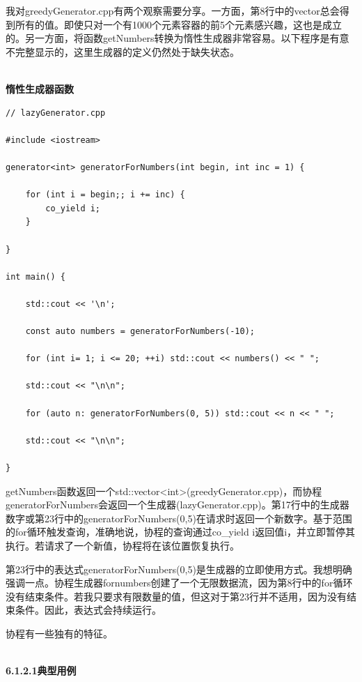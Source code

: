 我对greedyGenerator.cpp有两个观察需要分享。一方面，第8行中的vector总会得到所有的值。即使只对一个有1000个元素容器的前5个元素感兴趣，这也是成立的。另一方面，将函数getNumbers转换为惰性生成器非常容易。以下程序是有意不完整显示的，这里生成器的定义仍然处于缺失状态。

\hspace*{\fill} \\ %
\noindent
\textbf{惰性生成器函数}
\begin{lstlisting}[style=styleCXX]
// lazyGenerator.cpp

#include <iostream>

generator<int> generatorForNumbers(int begin, int inc = 1) {

	for (int i = begin;; i += inc) {
		co_yield i;
	}

}

int main() {

	std::cout << '\n';
	
	const auto numbers = generatorForNumbers(-10);
	
	for (int i= 1; i <= 20; ++i) std::cout << numbers() << " ";
	
	std::cout << "\n\n";
	
	for (auto n: generatorForNumbers(0, 5)) std::cout << n << " ";
	
	std::cout << "\n\n";

}
\end{lstlisting}

getNumbers函数返回一个std::vector<int>(greedyGenerator.cpp)，而协程generatorForNumbers会返回一个生成器(lazyGenerator.cpp)。第17行中的生成器数字或第23行中的generatorForNumbers(0,5)在请求时返回一个新数字。基于范围的for循环触发查询，准确地说，协程的查询通过co\_yield i返回值i，并立即暂停其执行。若请求了一个新值，协程将在该位置恢复执行。

第23行中的表达式generatorForNumbers(0,5)是生成器的立即使用方式。我想明确强调一点。协程生成器fornumbers创建了一个无限数据流，因为第8行中的for循环没有结束条件。若我只要求有限数量的值，但这对于第23行并不适用，因为没有结束条件。因此，表达式会持续运行。


协程有一些独有的特征。

\hspace*{\fill} \\ %
\noindent
\textbf{6.1.2.1\hspace{0.2cm}典型用例}

